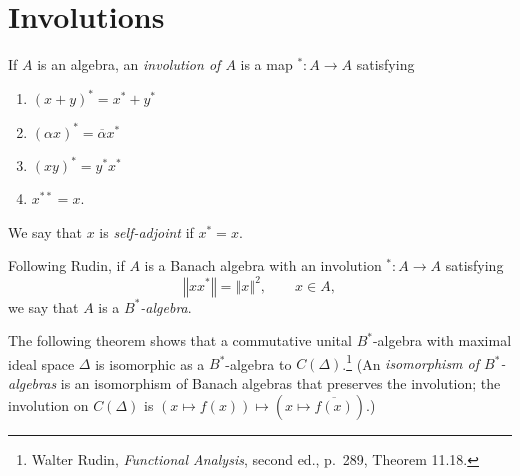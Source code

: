 \documentclass{article}
\newcommand{\norm}[1]{\left\Vert #1 \right\Vert}
\theoremstyle{definition}
\begin{document}
\section{Involutions}
If $A$ is an algebra, an {\em involution of $A$} is a map $^*:A \to A$ satisfying
\begin{enumerate}
\item $(x+y)^* = x^*+y^*$
\item $(\alpha x)^*=\overline{\alpha} x^*$
\item $(xy)^*=y^*x^*$
\item $x^{**}=x$.
\end{enumerate}
We say that $x$ is {\em self-adjoint} if $x^*=x$.

Following Rudin, if $A$ is a Banach algebra with an involution $^*:A \to A$ satisfying 
\[
\norm{xx^*}=\norm{x}^2, \qquad x \in A,
\]
we say that $A$ is a {\em $B^*$-algebra}.

The following theorem shows that a commutative unital $B^*$-algebra with maximal ideal space $\Delta$ is isomorphic as a $B^*$-algebra
to $C(\Delta)$.\footnote{Walter Rudin, {\em Functional Analysis}, second ed., p.~289, Theorem 11.18.} (An
{\em isomorphism of $B^*$-algebras} is an isomorphism of Banach algebras that preserves the involution;
the involution on $C(\Delta)$ is $(x \mapsto f(x)) \mapsto (x \mapsto \overline{f(x)})$.)
\end{document}
